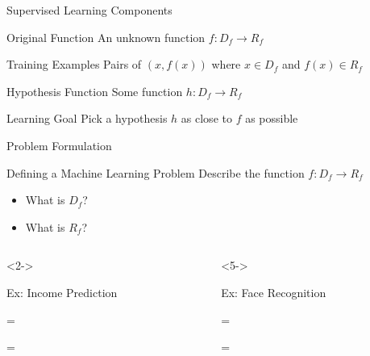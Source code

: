 \documentclass[14pt]{beamer}
\begin{document}
\begin{frame}{Supervised Learning Components}
\begin{block}{Original Function}
An unknown function $f\!: D_f \rightarrow R_f$
\end{block}
\pause
\begin{block}{Training Examples}
Pairs of $(x, f(x))$ where $x \in D_f$ and $f(x) \in R_f$
\end{block}
\pause
\begin{block}{Hypothesis Function}
Some function $h\!: D_f \rightarrow R_f$
\end{block}
\pause
\begin{block}{Learning Goal}
Pick a hypothesis $h$ as close to $f$ as possible
\end{block}
\end{frame}

\begin{frame}{Problem Formulation}
\begin{block}{Defining a Machine Learning Problem}
Describe the function $f\!: D_f \rightarrow R_f$
\begin{itemize}
\item What is $D_f$?
\item What is $R_f$?
\end{itemize}
\end{block}
\begin{columns}
\begin{column}{0.47\textwidth}<2->
\begin{block}{Ex: Income Prediction}
\begin{description}[$D_f$]
\item[$D_f$] = 
\item[$R_f$] = 
\end{description}
\end{block}
\end{column}
\begin{column}{0.47\textwidth}<5->
\begin{block}{Ex: Face Recognition}
\begin{description}[$D_f$]
\item[$D_f$] = 
\item[$R_f$] = 
\end{description}
\end{block}
\end{column}
\end{columns}
\bigskip
{}
\end{frame}
\end{document}
